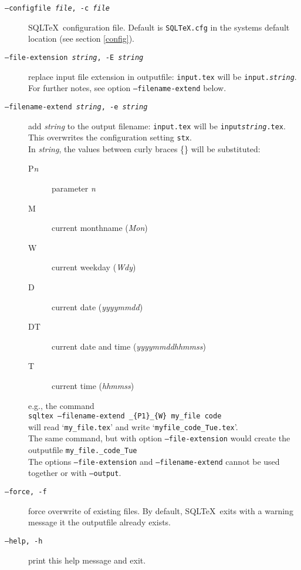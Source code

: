 \documentclass{article}
\begin{document}
\begin{description}
\item[\texttt{--configfile \textit{file}, -c \textit{file}}] SQL\TeX\ configuration file. Default is \texttt{SQLTeX.cfg} in the systems default location (see section \ref{config}).

\item[\texttt{--file-extension \textit{string}, -E \textit{string}}] replace input file extension in outputfile:
\texttt{input.tex} will be \texttt{input.\textit{string}}. \\
For further notes, see option \texttt{--filename-extend} below.

\item[\texttt{--filename-extend \textit{string}, -e \textit{string}}] add \textit{string} to the output filename:
\texttt{input.tex} will be \texttt{input\textit{string}.tex}. This overwrites
the configuration setting \texttt{stx}. \\
In \textit{string}, the values between curly braces \{\} will be substituted:
\begin{description}
\item[P\textit{n}] parameter \textit{n}
\item[M] current monthname (\textit{Mon})
\item[W] current weekday (\textit{Wdy})
\item[D] current date (\textit{yyyymmdd})
\item[DT] current date and time (\textit{yyyymmddhhmmss})
\item[T] current time (\textit{hhmmss})
\end{description}
e.g., the command\\
\hspace*{1em}\texttt{sqltex --filename-extend \_\{P1\}\_\{W\} my\_file code}\\
will read `\texttt{my\_file.tex}' and write `\texttt{myfile\_code\_Tue.tex}'.\\
The same command, but with option \texttt{---file-extension} would create the outputfile \texttt{my\_file.\_code\_Tue}\\
The options \texttt{--file-extension} and \texttt{--filename-extend} cannot be used together or with \texttt{--output}.

\item[\texttt{--force, -f}] force overwrite of existing files. By default, SQL\TeX\ exits with a
warning message it the outputfile already exists.

\item[\texttt{--help, -h}] print this help message and exit.


\end{description}
\end{document}
